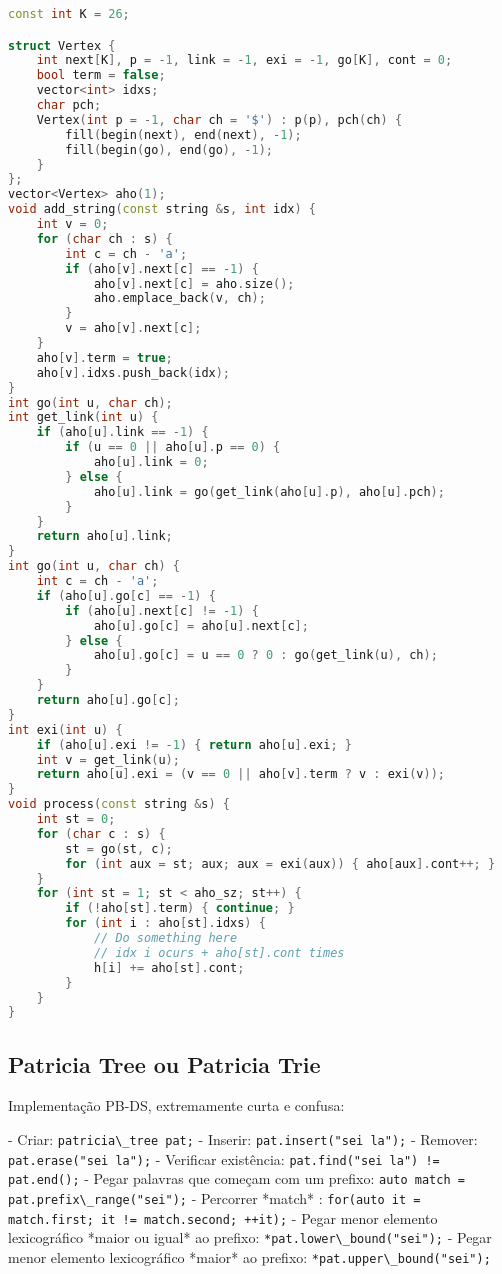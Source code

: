 \documentclass[11pt, a4paper, twoside]{article}
\begin{document}
\begin{lstlisting}[language=C++]
const int K = 26;

struct Vertex {
    int next[K], p = -1, link = -1, exi = -1, go[K], cont = 0;
    bool term = false;
    vector<int> idxs;
    char pch;
    Vertex(int p = -1, char ch = '$') : p(p), pch(ch) {
        fill(begin(next), end(next), -1);
        fill(begin(go), end(go), -1);
    }
};
vector<Vertex> aho(1);
void add_string(const string &s, int idx) {
    int v = 0;
    for (char ch : s) {
        int c = ch - 'a';
        if (aho[v].next[c] == -1) {
            aho[v].next[c] = aho.size();
            aho.emplace_back(v, ch);
        }
        v = aho[v].next[c];
    }
    aho[v].term = true;
    aho[v].idxs.push_back(idx);
}
int go(int u, char ch);
int get_link(int u) {
    if (aho[u].link == -1) {
        if (u == 0 || aho[u].p == 0) {
            aho[u].link = 0;
        } else {
            aho[u].link = go(get_link(aho[u].p), aho[u].pch);
        }
    }
    return aho[u].link;
}
int go(int u, char ch) {
    int c = ch - 'a';
    if (aho[u].go[c] == -1) {
        if (aho[u].next[c] != -1) {
            aho[u].go[c] = aho[u].next[c];
        } else {
            aho[u].go[c] = u == 0 ? 0 : go(get_link(u), ch);
        }
    }
    return aho[u].go[c];
}
int exi(int u) {
    if (aho[u].exi != -1) { return aho[u].exi; }
    int v = get_link(u);
    return aho[u].exi = (v == 0 || aho[v].term ? v : exi(v));
}
void process(const string &s) {
    int st = 0;
    for (char c : s) {
        st = go(st, c);
        for (int aux = st; aux; aux = exi(aux)) { aho[aux].cont++; }
    }
    for (int st = 1; st < aho_sz; st++) {
        if (!aho[st].term) { continue; }
        for (int i : aho[st].idxs) {
            // Do something here
            // idx i ocurs + aho[st].cont times
            h[i] += aho[st].cont;
        }
    }
}
\end{lstlisting}

\subsection{Patricia Tree ou Patricia Trie}

Implementação PB-DS, extremamente curta e confusa:

- Criar: \lstinline{patricia\_tree pat;}
- Inserir: \lstinline{pat.insert("sei la");}
- Remover: \lstinline{pat.erase("sei la");}
- Verificar existência: \lstinline{pat.find("sei la") != pat.end();}
- Pegar palavras que começam com um prefixo: \lstinline{auto match = pat.prefix\_range("sei");}
- Percorrer *match* : \lstinline{for(auto it = match.first; it != match.second; ++it);}
- Pegar menor elemento lexicográfico *maior ou igual* ao prefixo: \lstinline{*pat.lower\_bound("sei");} 
- Pegar menor elemento lexicográfico *maior* ao prefixo: \lstinline{*pat.upper\_bound("sei");} 
\end{document}
